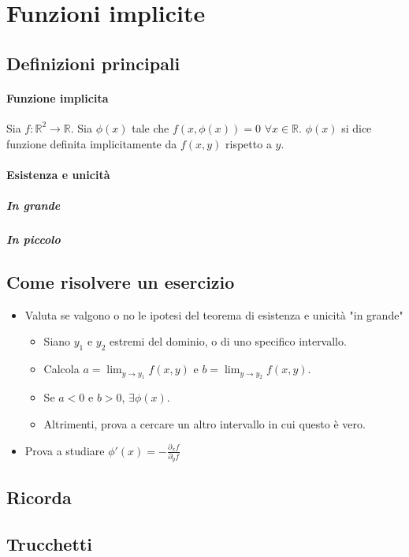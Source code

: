 \documentclass[a4paper,10pt]{book}
\begin{document}
\section{Funzioni implicite}
\subsection{Definizioni principali}
\paragraph{Funzione implicita}
Sia $f: \mathbb{R}^2 \rightarrow \mathbb{R}$.
Sia $\phi(x)$ tale che $f(x, \phi(x)) = 0$ $\forall x \in \mathbb{R}$. $\phi(x)$ si dice funzione definita implicitamente da $f(x, y)$ rispetto a $y$.

\paragraph{Esistenza e unicità}
\subparagraph{In grande}
\subparagraph{In piccolo}

\subsection{Come risolvere un esercizio}
\begin{itemize}
 \item Valuta se valgono o no le ipotesi del teorema di esistenza e unicità "in grande"
 \begin{itemize}
  \item Siano $y_1$ e $y_2$ estremi del dominio, o di uno specifico intervallo.
  \item Calcola $a = \lim_{y \to y_1}{f(x, y)}$ e $b = \lim_{y \to y_2}{f(x, y)}$.
  \item Se $a < 0$ e $b > 0$, $\exists \phi(x)$.
  \item Altrimenti, prova a cercare un altro intervallo in cui questo è vero.
 \end{itemize}
 \item Prova a studiare $\phi'(x) = -\displaystyle\frac{\partial_x f}{\partial_y f}$
\end{itemize}

\subsection{Ricorda}
\subsection{Trucchetti}
\end{document}
